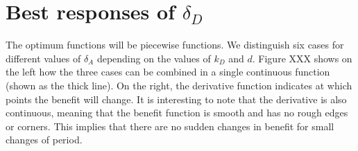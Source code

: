 %
%
%
%
%
%
%

\section{Best responses of $\delta_{D}$}
The optimum functions will be piecewise functions. We distinguish six cases for different values of $\delta_{A}$ depending on the values of $k_{D}$ and $d$. 
Figure XXX shows on the left how the three cases can be combined in a single continuous function (shown as the thick line). On the right, the derivative function indicates at which points the benefit will change. It is interesting to note that the derivative is also continuous, meaning that the benefit function is smooth and has no rough edges or corners. This implies that there are no sudden changes in benefit for small changes of period.


